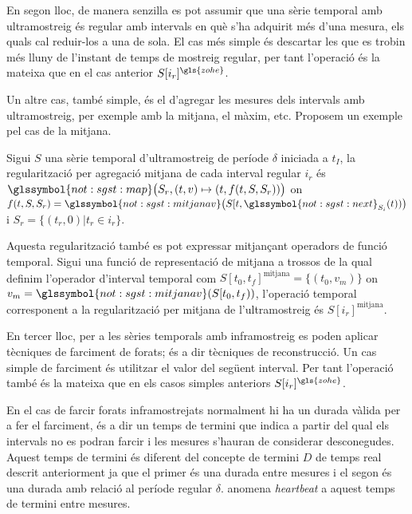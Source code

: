 En segon lloc, de manera senzilla es pot assumir que una sèrie
temporal amb ultramostreig és regular amb intervals en què s'ha
adquirit més d'una mesura, els quals cal reduir-los a una de sola. El
cas més simple és descartar les que es trobin més lluny de l'instant
de temps de mostreig regular, per tant l'operació és la mateixa que en
el cas anterior $S[i_r]^{\gls{zohe}}$.

Un altre cas, també simple, és el d'agregar les mesures dels intervals
amb ultramostreig, per exemple amb la mitjana, el màxim, etc.
Proposem un exemple pel cas de la mitjana.

Sigui $S$ una sèrie temporal d'ultramostreig de període $\delta$
iniciada a $t_I$, la regularització per agregació mitjana de cada
interval regular $i_r$ és $\glssymbol{not:sgst:map}\big(S_r, (t,v)
\mapsto (t,f(t,S,S_r))\big)$  on
$f(t,S,S_r)=\glssymbol{not:sgst:mitjanav}\big(S[t,
\glssymbol{not:sgst:next}_{S_i}(t))\big)$ i $S_r=\{ (t_r,0) | t_r\in
i_r \}$.

Aquesta regularització també es pot expressar mitjançant operadors de
funció temporal. Sigui una funció de representació de mitjana a trossos
de la qual definim l'operador d'interval temporal com
$S[t_0,t_f]^\text{mitjana}=\{(t_0,v_m)\}$  on
$v_m=\glssymbol{not:sgst:mitjanav}(S[t_0,t_f))$, l'operació temporal
corresponent a la regularització per mitjana de l'ultramostreig és
$S[i_r]^\text{mitjana}$.


En tercer lloc, per a les sèries temporals amb inframostreig es poden
aplicar tècniques de farciment de forats; és a dir tècniques de
reconstrucció. Un cas simple de farciment és utilitzar el valor del
següent interval. Per tant l'operació també és la mateixa que en els
casos simples anteriors $S[i_r]^{\gls{zohe}}$.

En el cas de farcir forats inframostrejats normalment hi ha un durada
vàlida per a fer el farciment, és a dir un temps de termini que indica
a partir del qual els intervals no es podran farcir i les mesures
s'hauran de considerar desconegudes. Aquest temps de termini és
diferent del concepte de termini $D$ de temps real descrit
anteriorment ja que el primer és una durada entre mesures i el segon
és una durada amb relació al període regular
$\delta$. \Textcite{rrdtool} anomena \emph{heartbeat} a aquest temps
de termini entre mesures.























